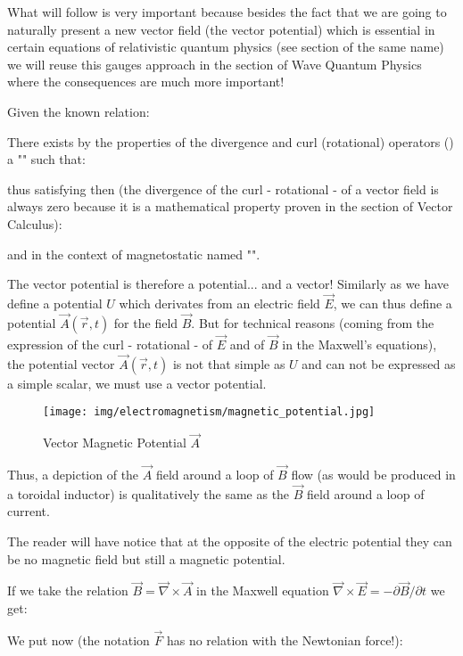 	What will follow is very important because besides the fact that we are going to naturally present a new vector field (the vector potential) which is essential in certain equations of relativistic quantum physics (see section of the same name) we will reuse this gauges approach in the section of Wave Quantum Physics where the consequences are much more important!
	
	Given the known relation:
	
	There exists by the properties of the divergence and curl (rotational) operators () a "" such that:
	
	thus satisfying then (the divergence of the curl - rotational - of a vector field is always zero because it is a mathematical property proven in the section of Vector Calculus):
	
	and in the context of magnetostatic named "". 
	\begin{tcolorbox}[title=Remark,colframe=black,arc=10pt]
	The vector potential is therefore a potential... and a vector! Similarly as we have define a potential $U$ which derivates from an electric field $\vec{E}$, we can thus define a potential $\vec{A}(\vec{r},t)$ for the field $\vec{B}$. But for technical reasons (coming from the expression of the curl - rotational - of $\vec{E}$ and of $\vec{B}$ in the Maxwell's equations), the potential vector $\vec{A}(\vec{r},t)$ is not that simple as $U$ and can not be expressed as a simple scalar, we must use a vector potential.
	\end{tcolorbox}
	\begin{figure}[H]
		\centering
		\texttt{[image: img/electromagnetism/magnetic\_potential.jpg]}
		\caption{Vector Magnetic Potential $\vec{A}$}
	\end{figure}
	Thus, a depiction of the $\vec{A}$ field around a loop of $\vec{B}$ flow (as would be produced in a toroidal inductor) is qualitatively the same as the $\vec{B}$ field around a loop of current.
	
	The reader will have notice that at the opposite of the electric potential they can be no magnetic field but still a magnetic potential.
	
	If we take the relation $\vec{B}=\vec{\nabla}\times\vec{A}$ in the Maxwell equation $\vec{\nabla}\times\vec{E}=-\partial \vec{B}/\partial t$ we get:
	
	We put now (the notation $\vec{F}$ has no relation with the Newtonian force!):
	
